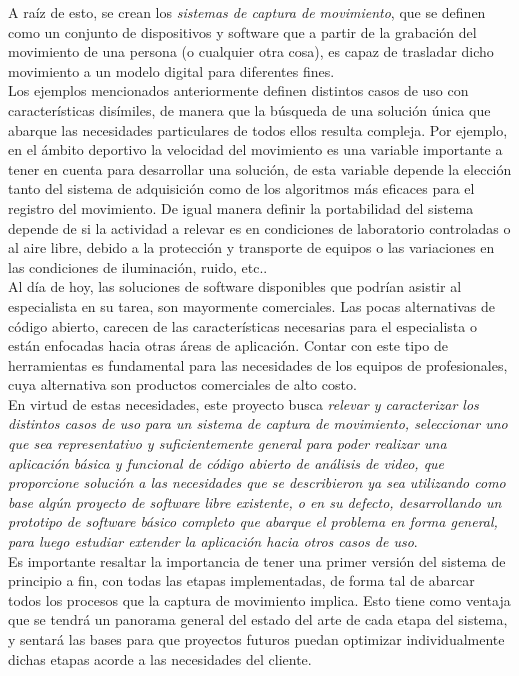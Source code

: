 A raíz de esto, se crean los \emph{sistemas de captura de movimiento}, que se definen como un conjunto de dispositivos y software que a partir de la grabación del movimiento de una persona (o cualquier otra cosa), es capaz de trasladar dicho movimiento a un modelo digital para diferentes fines.
\\ 

Los ejemplos mencionados anteriormente definen distintos casos de uso con características disímiles, de manera que la búsqueda de una solución única que abarque las necesidades particulares de todos ellos resulta compleja. Por ejemplo, en el ámbito deportivo la velocidad del movimiento es una variable importante a tener en cuenta para desarrollar una solución, de esta variable depende la elección tanto del sistema de adquisición como de los algoritmos más eficaces para el registro del movimiento.  De igual manera definir la portabilidad del sistema depende de si la actividad a relevar es en condiciones de laboratorio controladas o al aire libre, debido a la protección y transporte de equipos o las variaciones en las condiciones de iluminación, ruido, etc..
\\ 

Al  día  de  hoy,  las  soluciones  de  software  disponibles que  podrían  asistir al especialista en su tarea, son mayormente comerciales. Las pocas alternativas de código abierto, carecen de las características necesarias para el especialista o están enfocadas hacia otras áreas de aplicación. Contar con este tipo de herramientas es fundamental para las necesidades de los equipos de profesionales, cuya alternativa son productos comerciales de alto costo.
\\ 

En virtud de estas necesidades, este proyecto busca \emph{relevar y caracterizar los distintos casos de uso para un sistema de captura de movimiento,  seleccionar uno que sea representativo y suficientemente general para poder realizar una aplicación básica y funcional de código abierto de análisis de video, que proporcione solución a las necesidades que se describieron ya sea utilizando como base algún  proyecto  de  software  libre  existente,  o en su defecto, desarrollando un prototipo de software básico completo que abarque el problema en forma general, para luego estudiar extender la aplicación hacia otros casos de uso}.
\\ 

Es importante resaltar la importancia de tener una primer versión del sistema de principio a fin, con todas las etapas implementadas, de forma tal de abarcar todos los procesos que la captura de movimiento implica.  Esto tiene como ventaja que se tendrá un panorama general del estado del arte de cada etapa del sistema, y 
sentará las bases para que proyectos futuros puedan optimizar individualmente dichas etapas acorde a las necesidades del cliente.
\\ 

